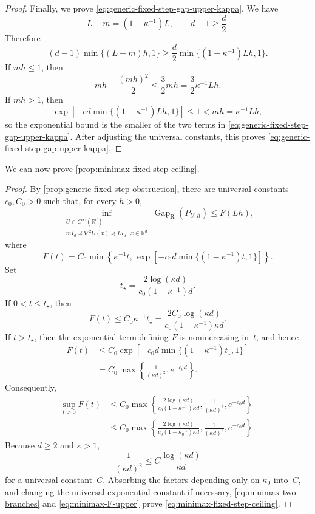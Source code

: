 \documentclass[11pt]{article}
\newcommand{\R}{\mathbb R}
\newcommand{\Gap}{\operatorname{Gap}_{\mathrm{R}}}
\newcommand{\1}{\mathbf 1}
\begin{document}
\begin{proof}
		Finally, we prove
		\eqref{eq:generic-fixed-step-gap-upper-kappa}.  We have
		\[
		L-m=(1-\kappa^{-1})L,
		\qquad
		d-1\geq\frac d2.
		\]
		Therefore
		\[
		(d-1)\min\{(L-m)h,1\}
		\geq
		\frac d2
		\min\{(1-\kappa^{-1})Lh,1\}.
		\]
		If $mh\leq1$, then
		\[
		mh+\frac{(mh)^2}{2}
		\leq\frac32mh
		=\frac32\kappa^{-1}Lh.
		\]
		If $mh>1$, then
		\[
		\exp\left[
		-cd\min\{(1-\kappa^{-1})Lh,1\}
		\right]
		\leq1<mh=\kappa^{-1}Lh,
		\]
		so the exponential bound is the smaller of the two terms in
		\eqref{eq:generic-fixed-step-gap-upper-kappa}.  After adjusting
		the universal constants, this proves
		\eqref{eq:generic-fixed-step-gap-upper-kappa}.
	\end{proof}
	
	
	
	We can now prove \cref{prop:minimax-fixed-step-ceiling}.
	
	\begin{proof}
		By \cref{prop:generic-fixed-step-obstruction}, there are universal
		constants $c_0,C_0>0$ such that, for every $h>0$,
		\begin{equation}
			\label{eq:minimax-two-branches}
			\inf_{\substack{U\in C^\infty(\R^d)\\
					mI_d\preceq\nabla^2U(x)\preceq LI_d,\ x\in\R^d}}
			\Gap(P_{U,h})
			\leq F(Lh),
		\end{equation}
		where
		\[
		F(t)
		=
		C_0\min\left\{
		\kappa^{-1}t,\,
		\exp\left[
		-c_0d\min\{(1-\kappa^{-1})t,1\}
		\right]
		\right\}.
		\]
		Set
		\[
		t_\star
		=
		\frac{2\log(\kappa d)}
		{c_0(1-\kappa^{-1})d}.
		\]
		If $0<t\leq t_\star$, then
		\[
		F(t)
		\leq
		C_0\kappa^{-1}t_\star
		=
		\frac{2C_0\log(\kappa d)}
		{c_0(1-\kappa^{-1})\kappa d}.
		\]
		If $t>t_\star$, then the exponential term defining $F$ is
		nonincreasing in~$t$, and hence
		\begin{align*}
			F(t)
			&\leq
			C_0\exp\left[
			-c_0d\min\{(1-\kappa^{-1})t_\star,1\}
			\right]\\
			&=
			C_0\max\left\{
			\frac{1}{(\kappa d)^2},
			e^{-c_0d}
			\right\}.
		\end{align*}
		Consequently,
		\begin{equation}\label{eq:minimax-F-upper}
			\begin{aligned}
				\sup_{t>0}F(t)
				&\leq
				C_0\max\left\{
				\frac{2\log(\kappa d)}
				{c_0(1-\kappa^{-1})\kappa d},
				\frac{1}{(\kappa d)^2},
				e^{-c_0d}
				\right\} \\
				&\leq C_0\max\left\{
				\frac{2\log(\kappa d)}
				{c_0(1-\kappa_0^{-1})\kappa d},
				\frac{1}{(\kappa d)^2},
				e^{-c_0d}
				\right\}.
			\end{aligned}
		\end{equation}
		Because $d\geq2$ and $\kappa>1$,
		\[
		\frac{1}{(\kappa d)^2}
		\leq
		C\frac{\log(\kappa d)}{\kappa d}
		\]
		for a universal constant~$C$.  Absorbing the factors depending
		only on $\kappa_0$ into~$C$, and changing the universal
		exponential constant if necessary, \eqref{eq:minimax-two-branches} and \eqref{eq:minimax-F-upper}
		prove \eqref{eq:minimax-fixed-step-ceiling}.
	\end{proof}
	
\end{document}
